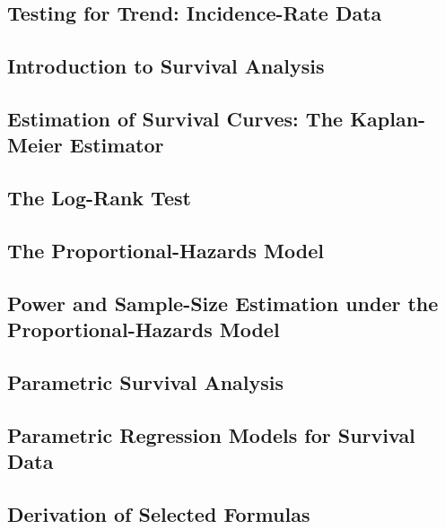 \documentclass[12pt,]{article}
\theoremstyle{definition}
\theoremstyle{definition}
\theoremstyle{definition}
\theoremstyle{remark}
\begin{document}
\subsection{Testing for Trend: Incidence-Rate
Data}\label{testing-for-trend-incidence-rate-data}

\subsection{Introduction to Survival
Analysis}\label{introduction-to-survival-analysis}

\subsection{Estimation of Survival Curves: The Kaplan-Meier
Estimator}\label{estimation-of-survival-curves-the-kaplan-meier-estimator}

\subsection{The Log-Rank Test}\label{the-log-rank-test}

\subsection{The Proportional-Hazards
Model}\label{the-proportional-hazards-model}

\subsection{Power and Sample-Size Estimation under the
Proportional-Hazards
Model}\label{power-and-sample-size-estimation-under-the-proportional-hazards-model}

\subsection{Parametric Survival
Analysis}\label{parametric-survival-analysis}

\subsection{Parametric Regression Models for Survival
Data}\label{parametric-regression-models-for-survival-data}

\subsection{Derivation of Selected
Formulas}\label{derivation-of-selected-formulas-1}


\end{document}
